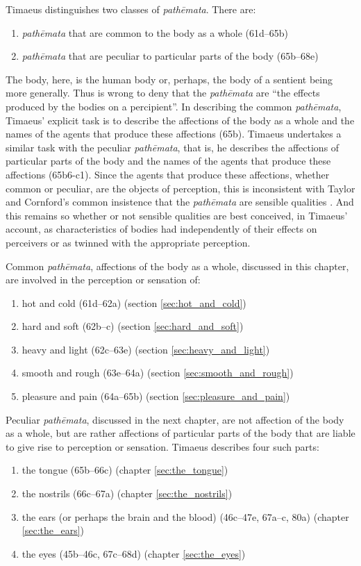 Timaeus distinguishes two classes of \emph{pathēmata}. There are:
\begin{enumerate}[(1)]
	\item \emph{pathēmata} that are common to the body as a whole (61d--65b)
	\item \emph{pathēmata} that are peculiar to particular parts of the body (65b--68e)
\end{enumerate}
The body, here, is the human body or, perhaps, the body of a sentient being more generally. Thus \citet[431]{Taylor:1928qb} is wrong to deny that the \emph{pathēmata} are ``the effects produced by the bodies on a percipient''. In describing the common \emph{pathēmata}, Timaeus' explicit task is to describe the affections of the body as a whole and the names of the agents that produce these affections (65b). Timaeus undertakes a similar task with the peculiar \emph{pathēmata}, that is, he describes the affections of particular parts of the body and the names of the agents that produce these affections (65b6-c1). Since the agents that produce these affections, whether common or peculiar, are the objects of perception, this is inconsistent with Taylor and Cornford's common insistence that the \emph{pathēmata} are sensible qualities \citep[see][225, n8]{Archer-Hind:1888qd}. And this remains so whether or not sensible qualities are best conceived, in Timaeus' account, as characteristics of bodies had independently of their effects on perceivers or as twinned with the appropriate perception. 

Common \emph{pathēmata}, affections of the body as a whole, discussed in this chapter, are involved in the perception or sensation of:
\begin{enumerate}[(1)]
 	\item hot and cold (61d--62a) (section \ref{sec:hot_and_cold})
 	\item hard and soft (62b--c) (section \ref{sec:hard_and_soft})
 	\item heavy and light (62c--63e) (section \ref{sec:heavy_and_light})
 	\item smooth and rough (63e--64a) (section \ref{sec:smooth_and_rough})
 	\item pleasure and pain (64a--65b) (section \ref{sec:pleasure_and_pain})
\end{enumerate}

Peculiar \emph{pathēmata}, discussed in the next chapter, are not affection of the body as a whole, but are rather affections of particular parts of the body that are liable to give rise to perception or sensation. Timaeus describes four such parts:
\begin{enumerate}[(1)]
	\item the tongue (65b--66c) (chapter \ref{sec:the_tongue})
	\item the nostrils (66c--67a) (chapter \ref{sec:the_nostrils})
	\item the ears (or perhaps the brain and the blood) (46c--47e, 67a--c, 80a) (chapter \ref{sec:the_ears})
	\item the eyes (45b--46c, 67c--68d) (chapter \ref{sec:the_eyes})
\end{enumerate}

